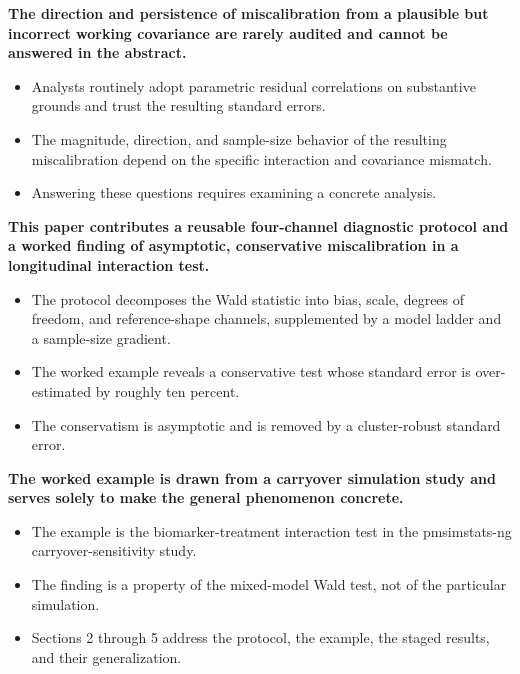 \documentclass[
  11pt,
]{article}
\begin{document}
\textbf{The direction and persistence of miscalibration from a plausible but incorrect working covariance are rarely audited and cannot be answered in the abstract.}

\begin{itemize}\setlength{\itemsep}{2pt}\setlength{\parskip}{0pt}
\item Analysts routinely adopt parametric residual correlations on substantive grounds and trust the resulting standard errors.
\item The magnitude, direction, and sample-size behavior of the resulting miscalibration depend on the specific interaction and covariance mismatch.
\item Answering these questions requires examining a concrete analysis.
\end{itemize}

\textbf{This paper contributes a reusable four-channel diagnostic protocol and a worked finding of asymptotic, conservative miscalibration in a longitudinal interaction test.}

\begin{itemize}\setlength{\itemsep}{2pt}\setlength{\parskip}{0pt}
\item The protocol decomposes the Wald statistic into bias, scale, degrees of freedom, and reference-shape channels, supplemented by a model ladder and a sample-size gradient.
\item The worked example reveals a conservative test whose standard error is over-estimated by roughly ten percent.
\item The conservatism is asymptotic and is removed by a cluster-robust standard error.
\end{itemize}

\textbf{The worked example is drawn from a carryover simulation study and serves solely to make the general phenomenon concrete.}

\begin{itemize}\setlength{\itemsep}{2pt}\setlength{\parskip}{0pt}
\item The example is the biomarker-treatment interaction test in the pmsimstats-ng carryover-sensitivity study.
\item The finding is a property of the mixed-model Wald test, not of the particular simulation.
\item Sections 2 through 5 address the protocol, the example, the staged results, and their generalization.
\end{itemize}
\end{document}
